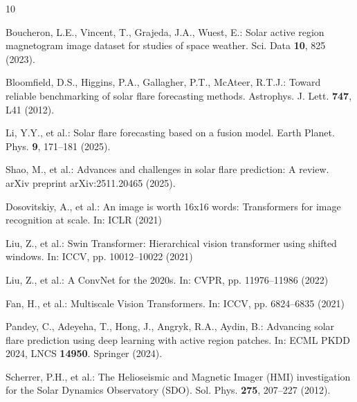 \documentclass[runningheads]{llncs}
\begin{document}
\begin{thebibliography}{10}

Boucheron, L.E., Vincent, T., Grajeda, J.A., Wuest, E.: Solar active region magnetogram image dataset for studies of space weather. Sci. Data \textbf{10}, 825 (2023). 

Bloomfield, D.S., Higgins, P.A., Gallagher, P.T., McAteer, R.T.J.: Toward reliable benchmarking of solar flare forecasting methods. Astrophys. J. Lett. \textbf{747}, L41 (2012). 

Li, Y.Y., et al.: Solar flare forecasting based on a fusion model. Earth Planet. Phys. \textbf{9}, 171--181 (2025). 

Shao, M., et al.: Advances and challenges in solar flare prediction: A review. arXiv preprint arXiv:2511.20465 (2025). 

Dosovitskiy, A., et al.: An image is worth 16x16 words: Transformers for image recognition at scale. In: ICLR (2021)

Liu, Z., et al.: Swin Transformer: Hierarchical vision transformer using shifted windows. In: ICCV, pp. 10012--10022 (2021)

Liu, Z., et al.: A ConvNet for the 2020s. In: CVPR, pp. 11976--11986 (2022)

Fan, H., et al.: Multiscale Vision Transformers. In: ICCV, pp. 6824--6835 (2021)



Pandey, C., Adeyeha, T., Hong, J., Angryk, R.A., Aydin, B.: Advancing solar flare prediction using deep learning with active region patches. In: ECML PKDD 2024, LNCS \textbf{14950}. Springer (2024). 


Scherrer, P.H., et al.: The Helioseismic and Magnetic Imager (HMI) investigation for the Solar Dynamics Observatory (SDO). Sol. Phys. \textbf{275}, 207--227 (2012). 

\end{thebibliography}
\end{document}
